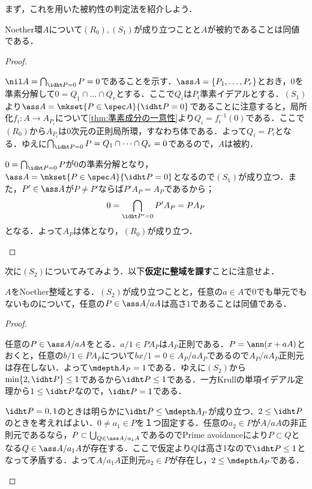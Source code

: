 まず，これを用いた被約性の判定法を紹介しよう．

\begin{thm}
	Noether環$A$について$(R_0),(S_1)$が成り立つことと$A$が被約であることは同値である．
\end{thm}

\begin{proof}
	\begin{eqv}
		\item $\nil A=\bigcap_{\idht P=0}P=0$であることを示す．$\ass A=\{P_1,\dots,P_r\}$とおき，$0$を準素分解して$0=Q_1\cap\dots\cap Q_r$とする．ここで$Q_i$は$P_i$準素イデアルとする．$(S_1)$より$\ass A=\mkset{P\in\spec A}{\idht P=0}$であることに注意すると，局所化$f_i:A\to A_{P_i}$について\ref{thm:準素成分の一意性}より$Q_i=f_i^{-1}(0)$である．ここで$(R_0)$から$A_{P_i}$は$0$次元の正則局所環，すなわち体である．よって$Q_i=P_i$となる．ゆえに$\bigcap_{\idht P=0}P=Q_1\cap\dots\cap Q_r=0$であるので，$A$は被約． 
		\item $0=\bigcap_{\idht P=0}P$が$0$の準素分解となり，$\ass A=\mkset{P\in\spec A}{\idht P=0}$となるので$(S_1)$が成り立つ．また，$P'\in\ass A$が$P\neq P'$ならば$P'A_P=A_P$であるから；
		\[0=\bigcap_{\idht P'=0}P'A_P=PA_P\]
		となる．よって$A_P$は体となり，$(R_0)$が成り立つ．
	\end{eqv}
\end{proof}

次に$(S_2)$についてみてみよう．以下\textbf{仮定に整域を課す}ことに注意せよ．

\begin{lem}
	$A$をNoether整域とする．$(S_2)$が成り立つことと，任意の$a\in A$で$0$でも単元でもないものについて，任意の$P\in\ass A/aA$は高さ$1$であることは同値である．
\end{lem}

\begin{proof}
	\begin{eqv}
		\item 任意の$P\in\ass A/aA$をとる．$a/1\in PA_P$は$A_P$正則である．$P=\ann (x+aA)$とおくと，任意の$b/1\in PA_P$について$bx/1=0\in A_P/aA_P$であるので$A_P/aA_P$正則元は存在しない．よって$\mdepth A_P=1$である．ゆえに$(S_2)$から$\min\{2,\idht P\}\leq1$であるから$\idht P\leq1$である．一方Krullの単項イデアル定理から$1\leq\idht P$なので，$\idht P=1$である．
		\item $\idht P=0,1$のときは明らかに$\idht P\leq\mdepth A_P$が成り立つ．$2\leq\idht P$のときを考えればよい．$0\neq a_1\in P$を１つ固定する．任意の$a_2\in P$が$A/aA$の非正則元であるなら，$P\subset\bigcup_{Q\in\ass A/a_1A}$であるのでPrime avoidanceにより$P\subset Q$となる$Q\in\ass A/a_1A$が存在する．ここで仮定より$Q$は高さ1なので$\idht P\leq1$となって矛盾する．よって$A/a_1A$正則元$a_2\in P$が存在し，$2\leq\mdepth A_P$である．
	\end{eqv}
\end{proof}


